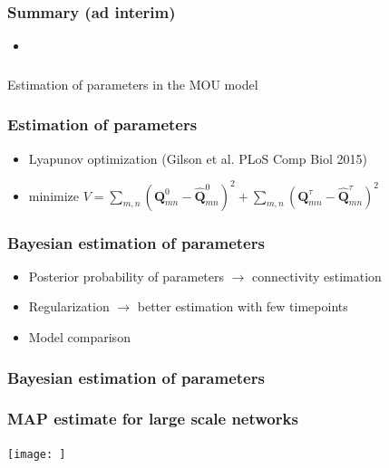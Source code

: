 \documentclass[final]{beamer}
\begin{document}
\begin{frame}
	\frametitle{Summary (ad interim)}
	\begin{itemize}
		\item 
	\end{itemize}
\end{frame}

\begin{frame}
\frametitle{}
\centering
Estimation of parameters in the MOU model
\end{frame}

\begin{frame}
\transdissolve
\frametitle{Estimation of parameters}
\begin{itemize}
	\item Lyapunov optimization (Gilson et al. PLoS Comp Biol 2015)
	\item minimize $V = \sum_{m,n} (\mathbf{Q}_{mn}^0 - \mathbf{\hat{Q}}_{mn}^0)^2 +
		\sum_{m,n} (\mathbf{Q}_{mn}^{\tau} - \mathbf{\hat{Q}}_{mn}^{\tau})^2$
\end{itemize}
\end{frame}

\begin{frame}
\transdissolve
\frametitle{Bayesian estimation of parameters}
\begin{itemize}
		\pause
	\item Posterior probability of parameters $\rightarrow$ connectivity estimation 
		\pause
	\item Regularization $\rightarrow$ better estimation with few timepoints
		\pause
	\item Model comparison 
\end{itemize}
\end{frame}

\begin{frame}
\transdissolve
\frametitle{Bayesian estimation of parameters}
\end{frame}

\begin{frame}
\frametitle{MAP estimate for large scale networks}
\begin{center}
\texttt{[image: ]}
\end{center}
\end{frame}
\end{document}
